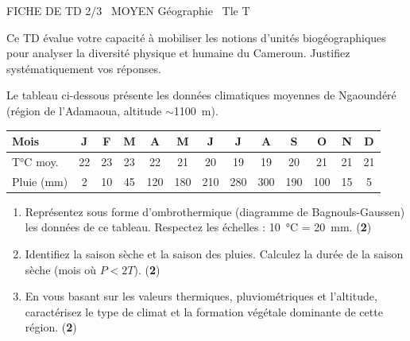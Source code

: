\documentclass[11pt]{article}
\begin{document}
\begin{tcolorbox}[enhanced,colback=popink,colframe=popink,arc=10pt,boxrule=0pt,left=12pt,right=12pt,top=9pt,bottom=9pt]
{\color{white}\popxbold\small FICHE DE TD 2/3 \textbullet\ MOYEN \hfill Géographie \textbullet\ Tle T\par}
\end{tcolorbox}
\vspace{4pt}
Ce TD évalue votre capacité à mobiliser les notions d'unités biogéographiques pour analyser la diversité physique et humaine du Cameroun. Justifiez systématiquement vos réponses.

\begin{exercice}
\label{exo:adamaoua}
Le tableau ci-dessous présente les données climatiques moyennes de Ngaoundéré (région de l'Adamaoua, altitude $\sim$\SI{1100}{\metre}).

\begin{tabular}{lcccccccccccc}
\toprule
Mois & J & F & M & A & M & J & J & A & S & O & N & D \\
\midrule
T°C moy. & 22 & 23 & 23 & 22 & 21 & 20 & 19 & 19 & 20 & 21 & 21 & 21 \\
Pluie (mm) & 2 & 10 & 45 & 120 & 180 & 210 & 280 & 300 & 190 & 100 & 15 & 5 \\
\bottomrule
\end{tabular}

\begin{enumerate}
    \item Représentez sous forme d'ombrothermique (diagramme de Bagnouls-Gaussen) les données de ce tableau. Respectez les échelles : \SI{10}{\celsius} = \SI{20}{\milli\metre}. (\textbf{2})
    \item Identifiez la saison sèche et la saison des pluies. Calculez la durée de la saison sèche (mois où $P < 2T$). (\textbf{2})
    \item En vous basant sur les valeurs thermiques, pluviométriques et l'altitude, caractérisez le type de climat et la formation végétale dominante de cette région. (\textbf{2})
\end{enumerate}
\end{exercice}
\end{document}

